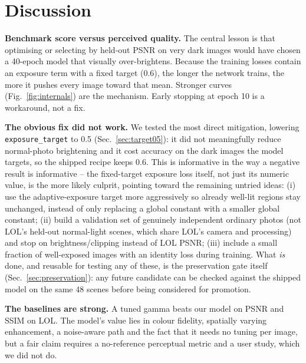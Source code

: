 \documentclass{article}
\newcommand{\code}[1]{\texttt{#1}}
\begin{document}
\section{Discussion}\label{sec:discussion}
\textbf{Benchmark score versus perceived quality.} The central lesson is that optimising or selecting by held-out PSNR on very dark images would have chosen a 40-epoch model that visually over-brightens. Because the training losses contain an exposure term with a fixed target (0.6), the longer the network trains, the more it pushes every image toward that mean. Stronger curves (Fig.~\ref{fig:internals}) are the mechanism. Early stopping at epoch 10 is a workaround, not a fix.

\textbf{The obvious fix did not work.} We tested the most direct mitigation, lowering \code{exposure\_target} to 0.5 (Sec.~\ref{sec:target05}): it did not meaningfully reduce normal-photo brightening and it cost accuracy on the dark images the model targets, so the shipped recipe keeps 0.6. This is informative in the way a negative result is informative -- the fixed-target exposure loss itself, not just its numeric value, is the more likely culprit, pointing toward the remaining untried ideas: (i) use the adaptive-exposure target more aggressively so already well-lit regions stay unchanged, instead of only replacing a global constant with a smaller global constant; (ii) build a validation set of genuinely independent ordinary photos (not LOL's held-out normal-light scenes, which share LOL's camera and processing) and stop on brightness/clipping instead of LOL PSNR; (iii) include a small fraction of well-exposed images with an identity loss during training. What \emph{is} done, and reusable for testing any of these, is the preservation gate itself (Sec.~\ref{sec:preservation}): any future candidate can be checked against the shipped model on the same 48 scenes before being considered for promotion.

\textbf{The baselines are strong.} A tuned gamma beats our model on PSNR and SSIM on LOL. The model's value lies in colour fidelity, spatially varying enhancement, a noise-aware path and the fact that it needs no tuning per image, but a fair claim requires a no-reference perceptual metric and a user study, which we did not do.
\end{document}
